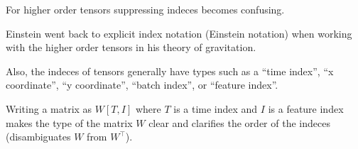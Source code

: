 {\vfill
For higher order tensors suppressing indeces becomes confusing.

\vfill
Einstein went back to explicit index notation (Einstein notation) when working with the higher order tensors in his theory of gravitation.


Also, the indeces of tensors generally have types such as a ``time index'', ``x coordinate'', ``y coordinate'', ``batch index'', or ``feature index''.

\vfill
Writing a matrix as $W[T,I]$ where $T$ is a time index and $I$ is a feature index makes the type of the matrix $W$ clear and clarifies
the order of the indeces (disambiguates $W$ from $W^\top$).

}


